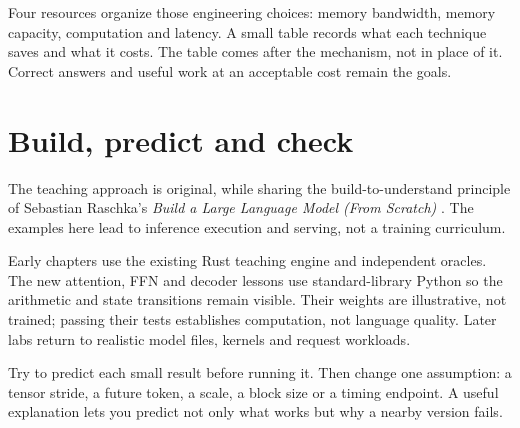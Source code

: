 Four resources organize those engineering choices: memory bandwidth,
memory capacity, computation and latency. A small table records what
each technique saves and what it costs. The table comes after the
mechanism, not in place of it. Correct answers and useful work at an
acceptable cost remain the goals.

\section*{Build, predict and check}
The teaching approach is original, while sharing the build-to-understand
principle of Sebastian Raschka's \emph{Build a Large Language Model
(From Scratch)} \cite{raschka2024build,raschka2026companion}. The examples here lead to
inference execution and serving, not a training curriculum.

Early chapters use the existing Rust teaching engine and independent
oracles. The new attention, FFN and decoder lessons use standard-library
Python so the arithmetic and state transitions remain visible. Their
weights are illustrative, not trained; passing their tests establishes
computation, not language quality. Later labs return to realistic model
files, kernels and request workloads.

Try to predict each small result before running it. Then change one
assumption: a tensor stride, a future token, a scale, a block size or
a timing endpoint. A useful explanation lets you predict not only
what works but why a nearby version fails.

